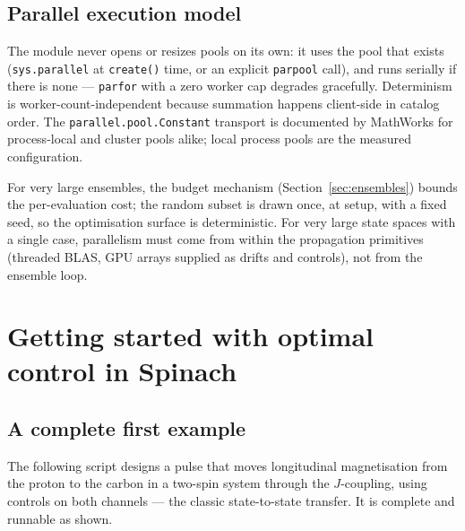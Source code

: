 \documentclass[11pt,a4paper]{article}
\newcommand{\code}[1]{\texttt{#1}}
\begin{document}
\subsection{Parallel execution model}

The module never opens or resizes pools on its own: it uses the pool
that exists (\code{sys.parallel} at \code{create()} time, or an explicit
\code{parpool} call), and runs serially if there is none ---
\code{parfor} with a zero worker cap degrades gracefully. Determinism is
worker-count-independent because summation happens client-side in
catalog order. The \code{parallel.pool.Constant} transport is documented
by MathWorks for process-local and cluster pools alike; local process
pools are the measured configuration.

For very large ensembles, the budget mechanism
(Section~\ref{sec:ensembles}) bounds the per-evaluation cost; the random
subset is drawn once, at setup, with a fixed seed, so the optimisation
surface is deterministic. For very large state spaces with a single
case, parallelism must come from within the propagation primitives
(threaded BLAS, GPU arrays supplied as drifts and controls), not from
the ensemble loop.
\section{Getting started with optimal control in Spinach}

\subsection{A complete first example}

The following script designs a pulse that moves longitudinal
magnetisation from the proton to the carbon in a two-spin system through
the $J$-coupling, using controls on both channels --- the classic
state-to-state transfer. It is complete and runnable as shown.
\end{document}
